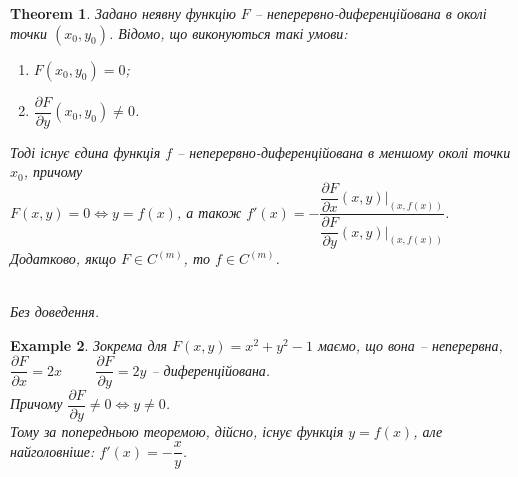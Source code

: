 \documentclass[a4paper, 10pt]{article}
\def\departial#1#2{\dfrac{\partial {#1}}{\partial {#2}}}
\theoremstyle{theoremdd}
\newtheorem{theorem}{Theorem}[subsection]
\theoremstyle{theoremdd}
\theoremstyle{theoremdd}
\theoremstyle{theoremdd}
\theoremstyle{theoremdd}
\newtheorem{example}[theorem]{Example}
\theoremstyle{theoremdd}
\theoremstyle{theoremdd}
\theoremstyle{theoremdd}
\theoremstyle{theoremdd}
\begin{document}
\begin{theorem}
Задано неявну функцію $F$ -- неперервно-диференційована в околі точки $(x_0,y_0)$. Відомо, що виконуються такі умови:
\begin{enumerate}[nosep,wide=0pt,label={\arabic*)}]
\item $F(x_0,y_0)=0$;
\item $\departial{F}{y}(x_0,y_0) \neq 0$.
\end{enumerate}
Тоді існує єдина функція $f$ -- неперервно-диференційована в меншому околі точки $x_0$, причому \\ $F(x,y) = 0 \iff y = f(x)$, а також $f'(x) = -\dfrac{\departial{F}{x}(x,y) \Big|_{(x,f(x))}}{\departial{F}{y}(x,y) \Big|_{(x,f(x))}}$.
\bigskip \\
Додатково, якщо $F \in C^{(m)}$, то $f \in C^{(m)}$.
\iffalse
Тоді справедливо наступне:\\
I) $\exists \delta_1,\delta_2 > 0: (x_0-\delta_1,x_0+\delta_1) \times (y_0-\delta_2,y_0+\delta_2) \subset U(x_0,y_0)$\\
II) $\exists f\colon (x_0-\delta_1,x_0+\delta_1) \to (y_0-\delta_2,y_0+\delta_2)$, така, що \\ $f \in C^{(m)}((x_0-\delta_1,x_0+\delta_1))$ та\\
$(x,y) \in (x_0-\delta_1,x_0+\delta_1) \times (y_0-\delta_2,y_0+\delta_2) \iff \begin{cases} x \in (x_0-\delta_1,x_0+\delta_1) \\ y \in (y_0-\delta_2,y_0+\delta_2) \end{cases}$\\
III) $F(x,y) = 0 \iff y=f(x)$\\
IV) $f'(x) = -\dfrac{\departial{F}{x}(x,y) \Big|_{(x,f(x))}}{\departial{F}{y}(x,y) \Big|_{(x,f(x))}}$\\
\textit{Без доведення. Можна подивитись у Зоріча зі 20 сторінками}
\fi
\\
\textit{Без доведення.}
\end{theorem}

\begin{example}
Зокрема для $F(x,y) = x^2+y^2-1$ маємо, що вона -- неперервна,\\
$\departial{F}{x} = 2x \hspace{1cm} \departial{F}{y} = 2y$ -- диференційована.\\
Причому $\departial{F}{y} \neq 0 \iff y \neq 0$.\\
Тому за попередньою теоремою, дійсно, існує функція $y = f(x)$, але найголовніше: $f'(x) = -\dfrac{x}{y}$.
\end{example}
\end{document}
